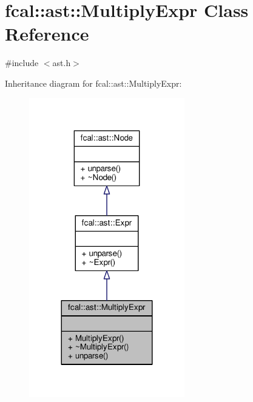 \hypertarget{classfcal_1_1ast_1_1MultiplyExpr}{}\section{fcal\+:\+:ast\+:\+:Multiply\+Expr Class Reference}
\label{classfcal_1_1ast_1_1MultiplyExpr}


{\ttfamily \#include $<$ast.\+h$>$}



Inheritance diagram for fcal\+:\+:ast\+:\+:Multiply\+Expr\+:
\nopagebreak
\begin{figure}[H]
\begin{center}
\leavevmode
\includegraphics[width=192pt]{classfcal_1_1ast_1_1MultiplyExpr__inherit__graph}
\end{center}
\end{figure}


